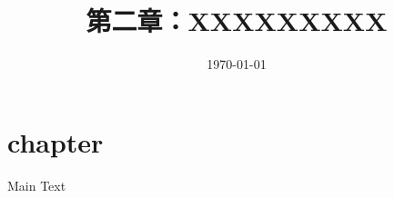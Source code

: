 \documentclass{ctexbook}
\title{第二章：XXXXXXXXX}
\author{\myAuthor}
\date{\today}
\begin{document}
    \maketitle
\fi

\chapter{chapter}


Main Text





\ifx\allfiles\undefined
    
\end{document}
